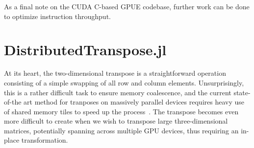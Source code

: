 As a final note on the CUDA C-based GPUE codebase, further work can be done to optimize instruction throughput.

\section{DistributedTranspose.jl}
\label{sec:DT}

At its heart, the two-dimensional transpose is a straightforward operation consisting of a simple swapping of all row and column elements.
Unsurprisingly, this is a rather difficult task to ensure memory coalescence, and 
the current state-of-the art method for tranposes on massively parallel devices requires heavy use of shared memory tiles to speed up the process~\cite{harris2013}.
The transpose becomes even more difficult to create when we wish to transpose large three-dimensional matrices, potentially spanning across multiple GPU devices, thus requiring an in-place transformation.


